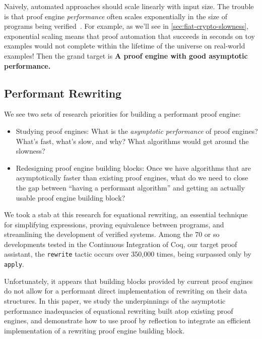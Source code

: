 \documentclass[sn-mathphys,pdflatex]{sn-jnl}%
\theoremstyle{thmstyleone}%
\theoremstyle{thmstyletwo}%
\theoremstyle{thmstylethree}%
\begin{document}
Naively, automated approaches should scale linearly with input size.
The trouble is that proof engine \emph{performance} often scales exponentially in the size of programs being verified~\cite{Gross2021thesis}.
For example, as we'll see in \autoref{sec:fiat-crypto-slowness}, exponential scaling means that proof automation that succeeds in seconds on toy examples would not complete within the lifetime of the universe on real-world examples!
Then the grand target is
\textbf{A proof engine with good asymptotic performance.}

\subsection{Performant Rewriting}\label{sec:approach}

We see two sets of research priorities for building a performant proof engine:

\begin{itemize}
	\item Studying proof engines:
	What is the \emph{asymptotic performance} of proof engines?
	What's fast, what's slow, and why?
	What algorithms would get around the slowness?
	\item Redesigning proof engine building blocks:
	Once we have algorithms that are asymptotically faster than existing proof engines, what do we need to close the gap between ``having a performant algorithm'' and getting an actually usable proof engine building block?
\end{itemize}

We took a stab at this research for equational rewriting, an essential technique for simplifying expressions, proving equivalence between programs, and streamlining the development of verified systems.
Among the 70 or so developments tested in the Continuous Integration of Coq, our target proof assistant, the \texttt{rewrite} tactic occurs over 350,000 times, being surpassed only by \texttt{apply}.

Unfortunately, it appears that building blocks provided by current proof engines do not allow for a performant direct implementation of rewriting on their data structures.
In this paper, we study the underpinnings of the asymptotic performance inadequacies of equational rewriting built atop existing proof engines, and demonstrate how to use proof by reflection to integrate an efficient implementation of a rewriting proof engine building block.
\end{document}
